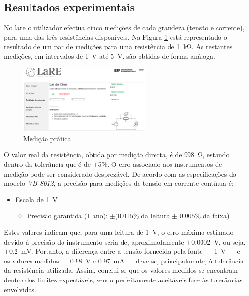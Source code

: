 \subsection{Resultados experimentais}
\label{sec:resultados_praticosOHM}
No \acrshort{lare} o utilizador efectua cinco medições de cada grandeza (tensão e corrente), para uma das três resistências disponíveis. Na Figura \ref{fig:resultados_medicoes_1k} está representado o resultado de um par de medições para uma resistência de \SI{1}{\kilo\ohm}. As restantes medições, em intervalos de \SI{1}{\volt} até \SI{5}{\volt}, são obtidas de forma análoga.

\begin{figure}[hbtp]
	\centering
	\includegraphics[width=0.6\textwidth]{figures/resultados_medicoes_ohm.png}
	\caption{Medição prática}
	\label{fig:resultados_medicoes_1k}
\end{figure}

O valor real da resistência, obtida por medição directa, é de \SI{998}{\ohm}, estando dentro da tolerância que é de $\pm$5\%. O erro associado aos instrumentos de medição pode ser considerado desprezável. De acordo com as especificações do modelo \textit{VB-8012}\cite{datasheetvb8012}, a precisão para medições de tensão em corrente contínua é:

\begin{itemize}
	\item Escala de \SI{1}{\volt}
	\begin{itemize}
		\item Precisão garantida (1 ano): $\pm$(0.015\% da leitura $\pm$ 0.005\% da faixa)
	\end{itemize}
\end{itemize}

Estes valores indicam que, para uma leitura de \SI{1}{\volt}, o erro máximo estimado devido à precisão do instrumento seria de, aproximadamente $\pm$\SI{0.0002}{\volt}, ou seja, $\pm$\SI{0.2}{\milli\volt}. Portanto, a diferença entre a tensão fornecida pela fonte — \SI{1}{\volt} — e os valores medidos — \SI{0.98}{\volt} e \SI{0.97}{\milli\ampere} — deve-se, principalmente, à tolerância da resistência utilizada. Assim, conclui-se que os valores medidos se encontram dentro dos limites expectáveis, sendo perfeitamente aceitáveis face às tolerâncias envolvidas.

